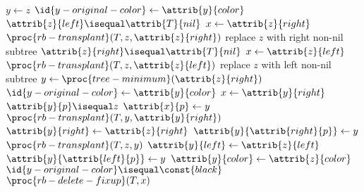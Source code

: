 \documentclass{article}
\begin{document}
\begin{codebox}
\li $y \gets{z}$
\li $\id{y-original-color} \gets{\attrib{y}{color}}$
\li \If $\attrib{z}{left} \isequal \attrib{T}{nil}$
\li \Then
        $x \gets{\attrib{z}{right}}$
\li     $\proc{rb-transplant}(T, z, \attrib{z}{right})$ \Comment replace $z$ with right non-nil subtree
\li \ElseIf $\attrib{z}{right} \isequal \attrib{T}{nil}$
\li \Then
        $x \gets{\attrib{z}{left}}$
\li     $\proc{rb-transplant}(T, z, \attrib{z}{left})$ \Comment replace $z$ with left non-nil subtree
\li \Else
\li     $y \gets{\proc{tree-minimum}(\attrib{z}{right})}$
\li     $\id{y-original-color} \gets{\attrib{y}{color}}$
\li     $x \gets{\attrib{y}{right}}$
\li     \If $\attrib{y}{p} \isequal z$
\li     \Then
            $\attrib{x}{p} \gets{y}$
\li     \Else
            $\proc{rb-transplant}(T, y, \attrib{y}{right})$
\li         $\attrib{y}{right} \gets{\attrib{z}{right}}$
\li         $\attrib{y}{\attrib{right}{p}} \gets{y}$
        \End
\li     $\proc{rb-transplant}(T, z, y)$
\li     $\attrib{y}{left} \gets{\attrib{z}{left}}$
\li     $\attrib{y}{\attrib{left}{p}} \gets{y}$
\li     $\attrib{y}{color} \gets{\attrib{z}{color}}$
    \End
\li \If $\id{y-original-color} \isequal \const{black}$
\li \Then
        $\proc{rb-delete-fixup}(T, x)$
    \End
\end{codebox}
\end{document}
